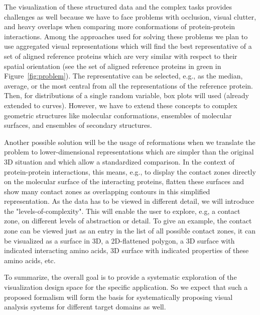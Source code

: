 \documentclass[11pt,a4paper,titlepage,oneside,onecolumn]{article}
\begin{document}
The visualization of these structured data and the complex tasks provides challenges as well because we have to face problems with occlusion, visual clutter, and heavy overlaps when comparing more conformations of protein-protein interactions.
Among the approaches used for solving these problems we plan to use aggregated visual representations which will find the best representative of a set of aligned reference proteins which are very similar with respect to their spatial orientation (see the set of aligned reference proteins in green in Figure~\ref{fig:problem}).
The representative can be selected, e.g.,  as the median, average, or the most central from all the representations of the reference protein.
Then, for distributions of a single random variable, box plots will used (already extended to curves).
However, we have to extend these concepts to complex geometric structures like molecular conformations, ensembles of molecular surfaces, and ensembles of secondary structures.

Another possible solution will be the usage of reformations when we translate the problem to lower-dimensional representations which are simpler than the original 3D situation and which allow a standardized comparison. 
In the context of protein-protein interactions, this means, e.g., to display the contact zones directly on the molecular surface of the interacting proteins, flatten these surfaces and show many contact zones as overlapping contours in this simplified representation.
As the data has to be viewed in different detail, we will introduce the "levels-of-complexity". 
This will enable the user to explore, e.g, a contact zone, on different levels of abstraction or detail.
To give an example, the contact zone can be viewed just as an entry in the list of all possible contact zones, it can be visualized as a surface in 3D, a 2D-flattened polygon, a 3D surface with indicated interacting amino acids, 3D surface with indicated properties of these amino acids, etc.

To summarize, the overall goal is to provide a systematic exploration of the visualization design space for the specific application.
So we expect that such a proposed formalism will form the basis for systematically proposing visual analysis systems for different target domains as well.
\end{document}
